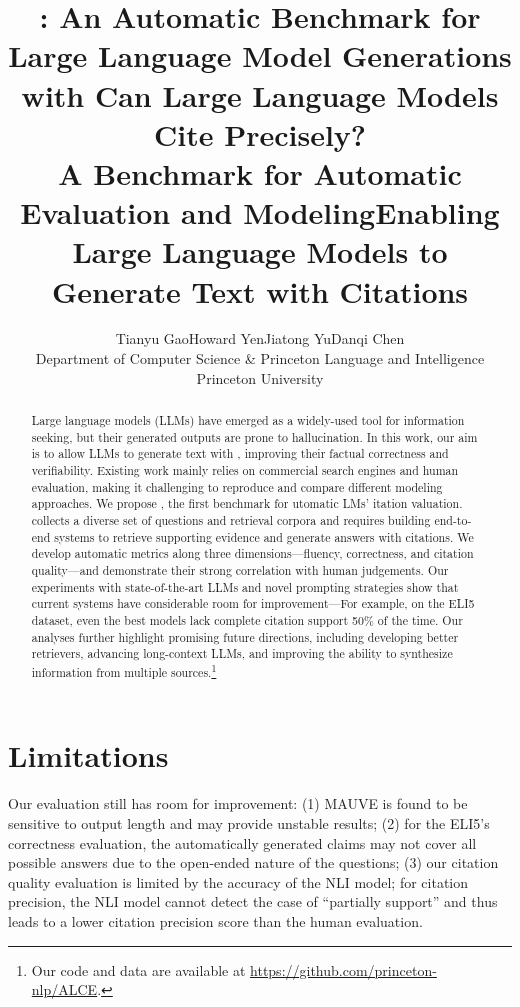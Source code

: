 \documentclass[11pt]{article}
\title{\citeeval{}: An Automatic Benchmark for\\ Large Language Model Generations with \ti{Citations}}
\title{Can Large Language Models Cite Precisely?\\ A Benchmark for Automatic Evaluation and Modeling}
\title{Enabling Large Language Models to Generate Text with Citations} %
\author{Tianyu Gao\quad Howard Yen\quad Jiatong Yu\quad Danqi Chen  \\
Department of Computer Science
\& Princeton Language and Intelligence\\
Princeton University \\
\ttt{\{tianyug,hyen,jiatongy,danqic\}@cs.princeton.edu}\quad
}
\begin{document}
\maketitle
\begin{abstract}




Large language models (LLMs) have emerged as a widely-used tool for information seeking, %
but their generated outputs are prone to hallucination. %
In this work, our aim is to allow LLMs to generate text with ,
improving their factual correctness and verifiability.
Existing work mainly relies on commercial search engines and human evaluation, making it challenging to reproduce and compare different modeling approaches.
We propose \tf{\citeeval{}}, %
the first benchmark for utomatic LMs' itation valuation. 
\citeeval{} collects a diverse set of questions and retrieval corpora
and requires building end-to-end systems to retrieve supporting evidence and generate answers with citations. 
We develop automatic metrics along three dimensions---fluency, correctness, and citation quality---and 
demonstrate their strong correlation with human judgements.
Our experiments with state-of-the-art LLMs and novel prompting strategies show that current systems have considerable room for improvement---For example, on the ELI5 dataset, 
even the best models lack complete citation support 50\% of the time.
Our analyses further highlight promising future directions, including
developing better retrievers,
advancing long-context LLMs,
and improving the ability to synthesize information from multiple sources.\footnote{Our code and data are available at \url{https://github.com/princeton-nlp/ALCE}.}

\end{abstract}







% 



\section*{Limitations}

 

Our evaluation still has room for improvement:
(1) MAUVE is found to be sensitive to output length and may provide unstable results;
(2) for the ELI5's correctness evaluation, the automatically generated claims may not cover all possible answers due to the open-ended nature of the questions;
(3) our citation quality evaluation is limited by the accuracy of the NLI model; for citation precision, the NLI model cannot detect the case of ``partially support'' and thus
leads to a lower citation precision score than the human evaluation.
\end{document}
